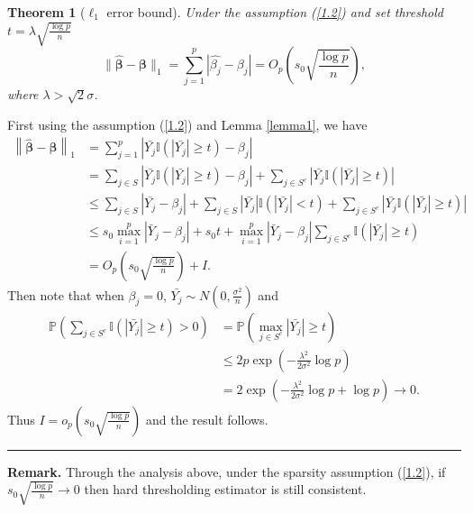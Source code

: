 \documentclass[12pt]{article}
\numberwithin{equation}{section}
\newtheorem{theorem}{Theorem}[section]
\newenvironment{proof}{{\bf Proof:}}{\hfill\rule{2mm}{2mm}}
\begin{document}
\begin{theorem}[$\ell_1$ error bound]\label{theorem1.3}
	Under the assumption (\ref{1.2}) and set threshold $t=\lambda\sqrt{\frac{\log p}{n}}$
	\begin{equation}
	\|\boldsymbol{\widehat\beta}-\boldsymbol{\beta}\|_1=\sum_{j=1}^p|\widehat{\beta_j}-\beta_{j}|=O_p\left(s_0\sqrt{\frac{\log p}{n}}\right),
	\end{equation}
	where $\lambda> \sqrt{2}\sigma$.
\end{theorem}
\begin{proof}
	First using the assumption (\ref{1.2}) and Lemma \ref{lemma1}, we have
	\begin{align*}
	\left\|\boldsymbol{\widehat\beta}-\boldsymbol{\beta}\right\|_1&=\sum_{j=1}^p\left|\bar{Y_j}\mathbb{I}\left(\left|\bar{Y_j}\right| \geq t\right)-\beta_{j}\right|\\
	&= \sum_{j\in S}\left|\bar{Y_j}\mathbb{I}\left(\left|\bar{Y_j}\right| \geq t\right)-\beta_{j}\right|+\sum_{j\in S^c}\left|\bar{Y_j}\mathbb{I}\left(\left|\bar{Y_j}\right| \geq t\right)\right|\\
	&\leq  \sum_{j\in S}\left|\bar{Y_j}-\beta_{j}\right|+\sum_{j\in S}\left|\bar{Y_j}\right|\mathbb{I}\left(\left|\bar{Y_j}\right| < t\right)+\sum_{j\in S^c}\left|\bar{Y_j}\mathbb{I}\left(\left|\bar{Y_j}\right| \geq t\right)\right|\\
	&\leq s_0\max _{i=1}^{p}\left|\bar Y_{j}-\beta_{j}\right|+s_0t+\max _{i=1}^{p}\left|\bar Y_{j}-\beta_{j}\right|\sum_{j\in S^c}\mathbb{I}\left(\left|\bar{Y_j}\right| \geq t\right)\\
	&=O_p\left(s_0\sqrt{\frac{\log p}{n}}\right)+I.
	\end{align*}
	Then note that when $\beta_{j}=0$, $\bar{Y_j}\sim N(0,\frac{\sigma^2}{n})$ and
	\begin{align*}
	\mathbb{P}\left(\sum_{j\in S^c}\mathbb{I}\left(\left|\bar{Y_j}\right| \geq t\right)>0\right)&=\mathbb{P}\left(\max_{j\in S^c}|\bar{Y_j}|\geq t\right)\\
	&\leq 2p\exp\left(-\frac{\lambda^2}{2\sigma^2}\log p\right)\\
	&= 2\exp\left(-\frac{\lambda^2}{2\sigma^2}\log p+\log p\right)\to 0.
	\end{align*}
	Thus $I=o_p\left(s_0\sqrt{\frac{\log p}{n}}\right)$ and the result follows.
\end{proof}\newline
\textbf{Remark.} Through the analysis above, under the sparsity assumption (\ref{1.2}), if $s_0\sqrt{\frac{\log p}{n}}\to 0$ then hard thresholding estimator is still consistent.
\end{document}
